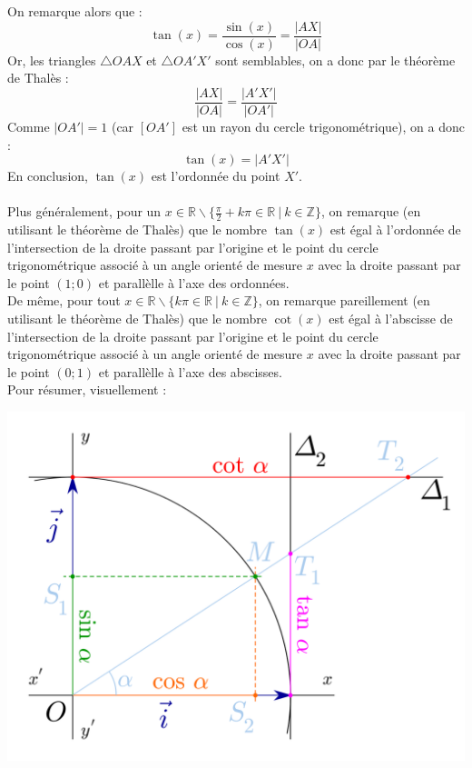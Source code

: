 \documentclass[a4paper,fontsize=13pt]{scrreprt}
\theoremstyle{plain}
\theoremstyle{definition}
\newcommand{\zz}{\mathbb{Z}}
\newcommand{\rr}{\mathbb{R}}
\newcommand {\axes} {
	\draw[thick, ->] (\xmin,0) -- (\xmax+1,0);
	\draw[thick, ->] (0,\ymin) -- (0,\ymax+1);
	\draw (0,\ymax+0.5) node [left] {$y$};
	\draw (\xmax+0.5, 0) node [below] {$x$};
	\draw[thick] (-0.15,1)--(0.15,1) (1,-0.15)--(1,0.15);
	\draw (0,1)node[left]{$1$} (1,0)node[below]{$1$};
}
\begin{document}
\begin{center}
\end{center}
On remarque alors que :
$$\tan(x) = \frac{\sin(x)}{\cos(x)} = \frac{|AX|}{|OA|}$$
Or, les triangles $\triangle OAX$ et $\triangle OA'X'$ sont semblables, on a donc par le théorème de Thalès :
$$\frac{|AX|}{|OA|} = \frac{|A'X'|}{|OA'|}$$
Comme $|OA'|=1$ (car $[OA']$ est un rayon du cercle trigonométrique), on a donc :
$$\tan(x) = |A'X'|$$
En conclusion, $\tan(x)$ est l'ordonnée du point $X'$. \\
~\\
Plus généralement, pour un $x \in \rr \backslash \{\frac{\pi}{2}+k\pi \in \rr ~|~k \in \zz\}$, on remarque (en utilisant le théorème de Thalès) que le nombre $\tan(x)$ est égal à l'ordonnée de l'intersection de la droite passant par l'origine et le point du cercle trigonométrique associé à un angle orienté de mesure $x$ avec la droite passant par le point $(1;0)$ et parallèlle à l'axe des ordonnées. \\
De même, pour tout $x \in \rr \backslash \{k\pi \in \rr ~|~k \in \zz\}$, on remarque pareillement (en utilisant le théorème de Thalès) que le nombre $\cot(x)$ est égal à l'abscisse de l'intersection de la droite passant par l'origine et le point du cercle trigonométrique associé à un angle orienté de mesure $x$ avec la droite passant par le point $(0;1)$ et parallèlle à l'axe des abscisses. \\
Pour résumer, visuellement :
\begin{center}
\includegraphics[scale=0.33]{ct}
\end{center}
\end{document}
